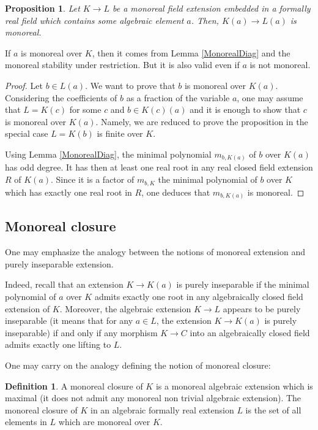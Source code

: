 \documentclass[12pt]{amsart}
\newtheorem{prop}[thm]{Proposition}
\theoremstyle{definition}
\newtheorem{defn}[thm]{Definition}
\begin{document}
\begin{prop}\label{MonorealBaseChange}
	Let $K\to L$ be a monoreal field extension embedded in a formally real field which contains some algebraic element $a$. Then, 
	$K(a)\to L(a)$ is monoreal.
\end{prop}	
If $a$ is monoreal over $K$, then it comes from Lemma \ref{MonorealDiag} and the monoreal stability under restriction.
But it is also valid even if $a$ is not monoreal.
\begin{proof}
Let $b\in L(a)$. We want to prove that $b$ is monoreal over $K(a)$. Considering the coefficients of $b$ as a fraction of the variable $a$, one may assume that $L=K(c)$ for some $c$ and $b\in K(c)(a)$ and it is enough to show that $c$ is monoreal over $K(a)$. Namely, we are reduced to prove the proposition in the special case $L=K(b)$ is finite over $K$. 

Using Lemma \ref{MonorealDiag}, the minimal polynomial $m_{b,K(a)}$ of $b$ over $K(a)$ has odd degree. It has then at least one real root in any real closed field extension $R$ of $K(a)$. Since it is a factor of $m_{b,K}$ the minimal polynomial of $b$ over $K$ which has exactly one real root in $R$, one deduces that 
$m_{b,K(a)}$ is monoreal.
\end{proof}




\subsection{Monoreal closure}

One may emphasize the analogy between the notions of monoreal extension and purely inseparable extension.

Indeed, recall that an extension $K\to K(a)$ is purely inseparable if the minimal polynomial of $a$ over $K$ admits exactly one root in any algebraically closed field extension of $K$. Moreover, 
the algebraic extension $K\to L$ appears to be purely inseparable (it means that for any $a\in L$, the extension $K\to K(a)$ is purely inseparable) if and only if any morphism $K\to C$ into an algebraically closed field admits exactly one lifting to $L$.

One may carry on the analogy defining the notion of monoreal closure:

\begin{defn} 
A monoreal closure of $K$ is a monoreal algebraic extension which is maximal (it does not admit any monoreal non trivial algebraic extension).
The monoreal closure of $K$ in an algebraic formally real extension $L$ is the set of all elements in $L$ which are monoreal over $K$.
\end{defn}	
\end{document}

